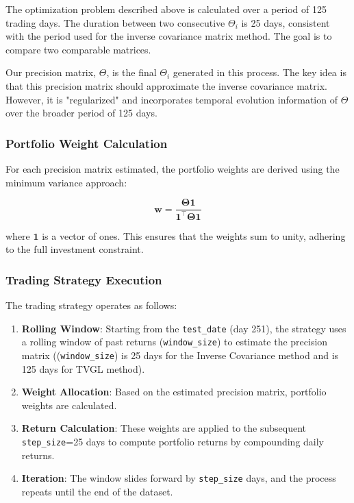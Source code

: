 \documentclass{article}
\begin{document}
The optimization problem described above is calculated over a period of 125 trading days. The duration between two consecutive \( \Theta_i \) is 25 days, consistent with the period used for the inverse covariance matrix method. The goal is to compare two comparable matrices. 

Our precision matrix, \( \Theta \), is the final \( \Theta_i \) generated in this process. The key idea is that this precision matrix should approximate the inverse covariance matrix. However, it is "regularized" and incorporates temporal evolution information of \( \Theta \) over the broader period of 125 days.

\subsubsection{Portfolio Weight Calculation}

For each precision matrix estimated, the portfolio weights are derived using the minimum variance approach:

\[
\mathbf{w} = \frac{\mathbf{\Theta} \mathbf{1}}{\mathbf{1}^\top \mathbf{\Theta} \mathbf{1}}
\]

where \(\mathbf{1}\) is a vector of ones. This ensures that the weights sum to unity, adhering to the full investment constraint.

\subsubsection{Trading Strategy Execution}

The trading strategy operates as follows:

\begin{enumerate}
    \item \textbf{Rolling Window}: Starting from the \texttt{test\_date} (day 251), the strategy uses a rolling window of past returns (\texttt{window\_size}) to estimate the precision matrix ((\texttt{window\_size}) is 25 days for the Inverse Covariance method and is 125 days for TVGL method). 
    \item \textbf{Weight Allocation}: Based on the estimated precision matrix, portfolio weights are calculated.
    \item \textbf{Return Calculation}: These weights are applied to the subsequent \texttt{step\_size}=25 days to compute portfolio returns by compounding daily returns.
    \item \textbf{Iteration}: The window slides forward by \texttt{step\_size} days, and the process repeats until the end of the dataset.
\end{enumerate}
\end{document}
